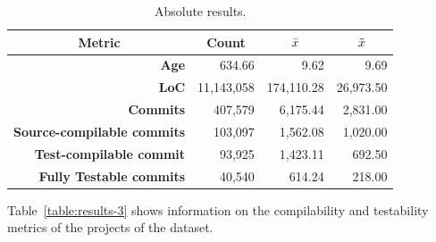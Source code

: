 \begin{table}[!htb]
    \centering
    \caption{Absolute results.}
    \label{table:results-1}
    \begin{tabular}{|r|r|r|r|}
        \hline
        \multicolumn{1}{|c|}{\textbf{Metric}}& \multicolumn{1}{c|}{\textbf{Count}} & \multicolumn{1}{c|}{\textbf{\large{$\bar{x}$}}} & \multicolumn{1}{c|}{\textbf{\large{$\tilde{x}$}}} \\ \hline
        \textbf{Age}                      & 634.66                              & 9.62                               & 9.69                                 \\ \hline
        \textbf{LoC}                      & 11,143,058                         & 174,110.28                          & 26,973.50                             \\ \hline
        \textbf{Commits}                  & 407,579                           & 6,175.44                            & 2,831.00                              \\ \hline
        \textbf{Source-compilable commits} & 103,097                           & 1,562.08                            & 1,020.00                              \\ \hline
        \textbf{Test-compilable commit}    & 93,925                            & 1,423.11                            & 692.50                               \\ \hline
        \textbf{Fully Testable commits}   & 40,540                            & 614.24                             & 218.00                               \\ \hline
    \end{tabular}
\end{table}

Table~\ref{table:results-3} shows information on the compilability and testability metrics of the projects of the dataset.

